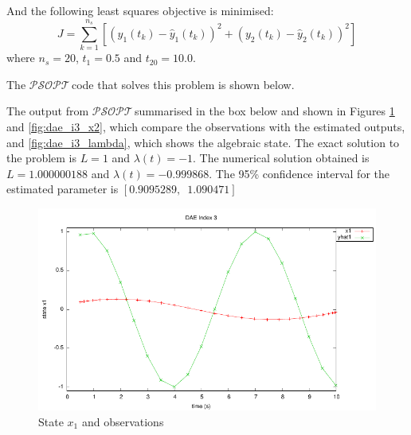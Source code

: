 \documentclass[a4paper,11pt]{report}    %
\newcommand{\psopt}{$\mathcal{PSOPT}$\,}  %
\newenvironment{shadedframe}{%
  \def\FrameCommand{\fcolorbox{black}{shadecolor}}%
  \MakeFramed {\FrameRestore}}
{\endMakeFramed}
\begin{document}
And the following least squares objective is minimised:
\begin{equation}
  J = \sum_{k=1}^{n_s} \left[ (y_1(t_k)-\hat{y}_1(t_k))^2 + (y_2(t_k)-\hat{y}_2(t_k))^2 \right] 
\end{equation}
where $n_s=20$, $t_1=0.5$ and $t_{20}=10.0$. 


The \psopt code that solves this problem is shown below.  

\tiny
\begin{shadedframe}

\end{shadedframe}
\normalsize

The output from \psopt summarised in the box below and shown in Figures \ref{fig:dae_i3_x1} and \ref{fig:dae_i3_x2}, which
compare the observations with the estimated outputs, and \ref{fig:dae_i3_lambda}, which shows the algebraic state. The exact solution to the problem is $L=1$ and $\lambda(t)=-1$. The numerical solution obtained is
$L= 1.000000188$ and $\lambda(t)=-0.999868$. The 95\% confidence interval for the estimated parameter is $[0.9095289, \,\,\,1.090471]$

\begin{shadedframe}

\end{shadedframe}

\begin{figure}
  \centering 
  \includegraphics{../examples/dae_i3/x1}
  \caption{State $x_1$ and observations}
 \label{fig:dae_i3_x1}
\end{figure}
\end{document}
